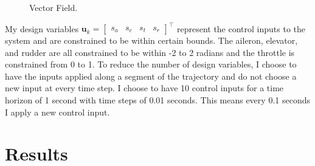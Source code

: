\documentclass{article}
\begin{document}
\begin{figure}
	\centering
	\caption{Vector Field.}
\label{fig:vet_field}

\end{figure}

My design variables $\mathbf{u}_k =\begin{bmatrix}s_{a} & s_{e} & s_{t} & s_{r}\end{bmatrix}^{\top}$ represent the control inputs to the system and are constrained to be within certain bounds. The aileron, elevator, and rudder are all constrained to be within -2 to 2 radians and the throttle is constrained from 0 to 1. To reduce the number of design variables, I choose to have the inputs applied along a segment of the trajectory and do not choose a new input at every time step. I choose to have 10 control inputs for a time horizon of 1 second with time steps of 0.01 seconds. This means every 0.1 seconds I apply a new control input.





\section*{Results}
\end{document}

